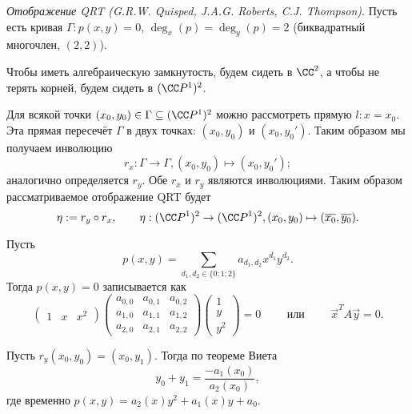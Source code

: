 \documentclass[12pt,a4paper]{article}
\begin{document}
    \begin{definition}
        \emph{Отображение QRT (G.R.W. Quisped, J.A.G. Roberts, C.J. Thompson)}. Пусть есть кривая $\Gamma: p(x, y) = 0$, $\deg_x(p) = \deg_y(p) = 2$ (биквадратный многочлен, $(2, 2)$).

        Чтобы иметь алгебраическую замкнутость, будем сидеть в $\CC^2$, а чтобы не терять корней, будем сидеть в $(\CC P^1)^2$.

        Для всякой точки $(x_0, y_0) \in \Gamma \subseteq (\CC P^1)^2$ можно рассмотреть прямую $l: x = x_0$. Эта прямая пересечёт $\Gamma$ в двух точках: $(x_0, y_0)$ и $(x_0, y_0')$. Таким образом мы получаем инволюцию
        \[r_x: \Gamma \to \Gamma, (x_0, y_0) \mapsto (x_0, y_0');\]
        аналогично определяется $r_y$. Обе $r_x$ и $r_y$ являются инволюциями. Таким образом рассматриваемое отображение QRT будет
        \[\eta := r_y \circ r_x, \qquad \eta: (\CC P^1)^2 \to (\CC P^1)^2, (x_0, y_0) \mapsto (\overline{x_0}, \overline{y_0}).\]
    \end{definition}

    \begin{definition}
        Пусть
        \[p(x, y) = \sum_{d_1, d_2 \in \{0; 1; 2\}} a_{d_1, d_2} x^{d_1} y^{d_2}.\]
        Тогда $p(x, y) = 0$ записывается как
        \[
            \begin{pmatrix}
                1& x& x^2
            \end{pmatrix}
            \begin{pmatrix}
                a_{0,0}& a_{0, 1}& a_{0, 2}\\
                a_{1,0}& a_{1, 1}& a_{1, 2}\\
                a_{2,0}& a_{2, 1}& a_{2, 2}
            \end{pmatrix}
            \begin{pmatrix}
                1\\
                y\\
                y^2
            \end{pmatrix}
            = 0
            \qquad \text{ или } \qquad
            \vec{x}^T A \vec{y} = 0.
        \]
    \end{definition}
    
    \begin{remark}
        Пусть $r_y(x_0, y_0) = (x_0, y_1)$. Тогда по теореме Виета
        \[y_0 + y_1 = \frac{-a_1(x_0)}{a_2(x_0)},\]
        где временно $p(x, y) = a_2(x) y^2 + a_1(x) y + a_0$.
    \end{remark}
\end{document}
